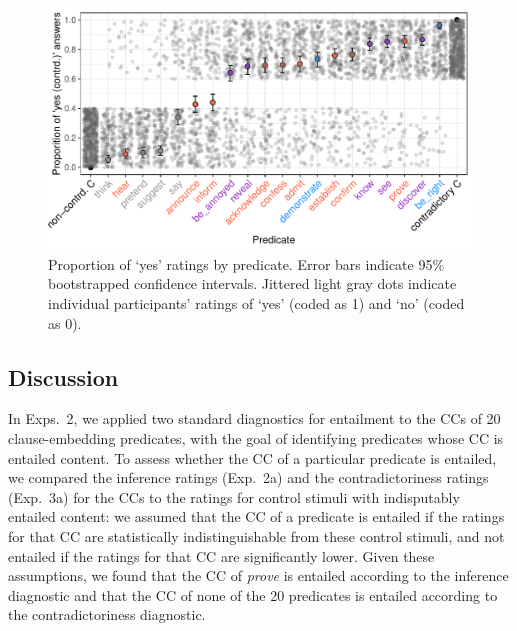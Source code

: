 \documentclass[11pt,fleqn]{article}
\newcommand{\6}{\mbox{$[\hspace*{-.6mm}[$}}
\newcommand{\9}{\mbox{$]\hspace*{-.6mm}]$}}
\begin{document}
{\begin{figure}
\centering
\includegraphics[width=.7\paperwidth]{../../results/6-veridicality2-binary/graphs/proportion-by-predicate-variability-individual}
\caption{Proportion of `yes' ratings by predicate. Error bars indicate 95\% bootstrapped confidence intervals. Jittered light gray dots indicate individual participants' ratings of `yes' (coded as 1) and `no' (coded as 0). }
\label{f-binary}
\end{figure}

\subsection{Discussion}\label{s33}

In Exps.~2, we applied two standard diagnostics for entailment to the CCs of 20 clause-embedding predicates, with the goal of identifying predicates whose CC is entailed content. To assess whether the CC of a particular predicate is entailed, we compared the inference ratings (Exp.~2a) and the contradictoriness ratings (Exp.~3a) for the CCs to the ratings for control stimuli with indisputably entailed content: we assumed that the CC of a predicate is entailed if the ratings for that CC are statistically indistinguishable from these control stimuli, and not entailed if the ratings for that CC are significantly lower. Given these assumptions, we found that the CC of {\em prove} is entailed according to the inference diagnostic and that the CC of none of the 20 predicates is entailed according to the contradictoriness diagnostic. 

}
\end{document}
